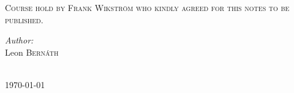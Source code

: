 \begin{titlepage}
    \textsc{\large Course hold by Frank Wikström who kindly agreed for this notes to be published.}\\[1.5cm] %


    \begin{minipage}{0.5\textwidth}
      \begin{flushleft} \large
        \emph{Author:}\\
        Leon \textsc{Bernáth} \\
      \end{flushleft}

    \end{minipage}\\[2cm]



    {\large \today}\\[2cm] %

    \vfill %

  \end{titlepage}

